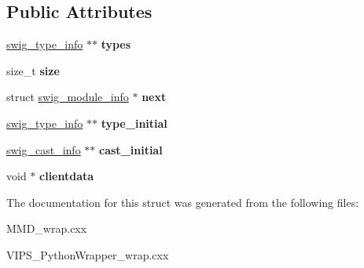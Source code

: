 \subsection*{Public Attributes}
\begin{DoxyCompactItemize}
\item 
\hyperlink{structswig__type__info}{swig\+\_\+type\+\_\+info} $\ast$$\ast$ {\bfseries types}\hypertarget{structswig__module__info_a0a70e9ae189c2a26c92adbf2fabcd549}{}\label{structswig__module__info_a0a70e9ae189c2a26c92adbf2fabcd549}

\item 
size\+\_\+t {\bfseries size}\hypertarget{structswig__module__info_aaf8907cf8509ee0464af8c9dfd909042}{}\label{structswig__module__info_aaf8907cf8509ee0464af8c9dfd909042}

\item 
struct \hyperlink{structswig__module__info}{swig\+\_\+module\+\_\+info} $\ast$ {\bfseries next}\hypertarget{structswig__module__info_adc59649870cda1ab12f45e57de99e572}{}\label{structswig__module__info_adc59649870cda1ab12f45e57de99e572}

\item 
\hyperlink{structswig__type__info}{swig\+\_\+type\+\_\+info} $\ast$$\ast$ {\bfseries type\+\_\+initial}\hypertarget{structswig__module__info_aaf36c0bb2e9e796ff1576359d52507c9}{}\label{structswig__module__info_aaf36c0bb2e9e796ff1576359d52507c9}

\item 
\hyperlink{structswig__cast__info}{swig\+\_\+cast\+\_\+info} $\ast$$\ast$ {\bfseries cast\+\_\+initial}\hypertarget{structswig__module__info_a14e4f7b0c9e0ff10543475c269b83507}{}\label{structswig__module__info_a14e4f7b0c9e0ff10543475c269b83507}

\item 
void $\ast$ {\bfseries clientdata}\hypertarget{structswig__module__info_a39999692b76f191b66a5ce746681dc84}{}\label{structswig__module__info_a39999692b76f191b66a5ce746681dc84}

\end{DoxyCompactItemize}


The documentation for this struct was generated from the following files\+:\begin{DoxyCompactItemize}
\item 
M\+M\+D\+\_\+wrap.\+cxx\item 
V\+I\+P\+S\+\_\+\+Python\+Wrapper\+\_\+wrap.\+cxx\end{DoxyCompactItemize}
